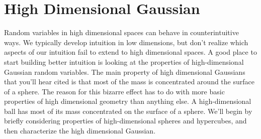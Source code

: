 \section{High Dimensional Gaussian }
Random variables in high dimensional spaces can behave in counterintuitive ways. We typically develop intuition in low dimensions, but don't realize which aspects of our intuition fail to extend to high dimensional spaces. A good place to start building better intuition is looking at the properties of high-dimensional Gaussian random variables. The main property of high dimensional Gaussians that you'll hear cited is that most of the mass is concentrated around the surface of a sphere. The reason for this bizarre effect has to do with more basic properties of high dimensional geometry than anything else. A high-dimensional ball has most of its mass concentrated on the surface of a sphere. We'll begin by briefly considering properties of high-dimensional spheres and hypercubes, and then characterize the high dimensional Gaussian. 

